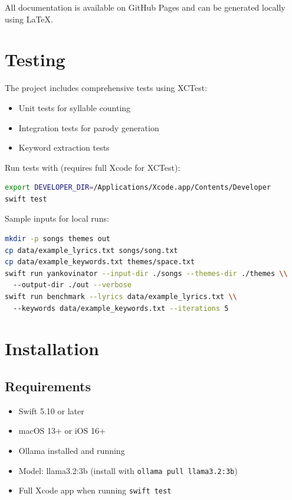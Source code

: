 \documentclass[11pt,a4paper]{article}
\begin{document}
All documentation is available on GitHub Pages and can be generated locally using LaTeX.

\section{Testing}

The project includes comprehensive tests using XCTest:

\begin{itemize}
    \item Unit tests for syllable counting
    \item Integration tests for parody generation
    \item Keyword extraction tests
\end{itemize}

Run tests with (requires full Xcode for XCTest):
\begin{lstlisting}[language=bash]
export DEVELOPER_DIR=/Applications/Xcode.app/Contents/Developer
swift test
\end{lstlisting}

Sample inputs for local runs:
\begin{lstlisting}[language=bash]
mkdir -p songs themes out
cp data/example_lyrics.txt songs/song.txt
cp data/example_keywords.txt themes/space.txt
swift run yankovinator --input-dir ./songs --themes-dir ./themes \\
  --output-dir ./out --verbose
swift run benchmark --lyrics data/example_lyrics.txt \\
  --keywords data/example_keywords.txt --iterations 5
\end{lstlisting}

\section{Installation}

\subsection{Requirements}

\begin{itemize}
    \item Swift 5.10 or later
    \item macOS 13+ or iOS 16+
    \item Ollama installed and running
    \item Model: llama3.2:3b (install with \texttt{ollama pull llama3.2:3b})
    \item Full Xcode app when running \texttt{swift test}
\end{itemize}
\end{document}

